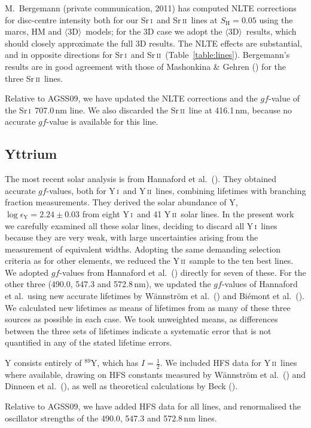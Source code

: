 \documentclass[traditabstract]{aa}
\newcommand{\oneDAV}{$\langle\mathrm{3D}\rangle$}
\newcommand{\altsri}{Sr\,\textsc{i}}
\newcommand{\altsrii}{Sr\,\textsc{ii}}
\newcommand{\altyi}{Y\,\textsc{i}}
\newcommand{\altyii}{Y\,\textsc{ii}}
\newcommand{\sri}{\altsri\ }
\newcommand{\srii}{\altsrii\ }
\newcommand{\yi}{\altyi\ }
\newcommand{\yii}{\altyii\ }
\begin{document}
M.~Bergemann (private communication, 2011) has computed NLTE corrections for disc-centre intensity both for our \sri and \srii lines at $S_\mathrm{H}=0.05$ using the {\sc marcs}, HM and \oneDAV\ models; for the 3D case we adopt the \oneDAV\ results, which should closely approximate the full 3D results.  The NLTE effects are substantial, and in opposite directions for \sri and \srii (Table~\ref{table:lines}). Bergemann's results are in good agreement with those of Mashonkina \& Gehren (\cite{mash}) for the three \srii lines.

Relative to AGSS09, we have updated the NLTE corrections and the $gf$-value of the \sri 707.0\,nm line.  We also discarded the \srii line at 416.1\,nm, because no accurate $gf$-value is available for this line.

\subsection{Yttrium}
The most recent solar analysis is from Hannaford et al.\ (\cite{hann1}). They obtained accurate $gf$-values, both for \yi and \yii lines, combining lifetimes with branching fraction measurements.  They derived the solar abundance of Y, $\log\epsilon_{\mathrm{Y}}=2.24\pm0.03$ from eight \yi and 41 \yii solar lines. In the present work we carefully examined all these solar lines, deciding to discard all \yi lines because they are very weak, with large uncertainties arising from the measurement of equivalent widths. Adopting the same demanding selection criteria as for other elements, we reduced the \yii sample to the ten best lines.  We adopted $gf$-values from Hannaford et al.\ (\cite{hann1}) directly for seven of these. For the other three (490.0, 547.3 and 572.8\,nm), we updated the $gf$-values of Hannaford et al.\ using new accurate lifetimes by W\"{a}nnstr\"{o}m et al.\ (\cite{wann}) and Bi\'{e}mont et al.\ (\cite{biem7}).  We calculated new lifetimes as means of lifetimes from as many of these three sources as possible in each case.  We took unweighted means, as differences between the three sets of lifetimes indicate a systematic error that is not quantified in any of the stated lifetime errors.

Y consists entirely of $^{89}$Y, which has $I=\frac12$.  We included HFS data for \yii lines where available, drawing on HFS constants measured by W\"{a}nnstr\"{o}m et al.\ (\cite{wann}) and Dinneen et al.\ (\cite{Dinneen}), as well as theoretical calculations by Beck (\cite{Beck}).

Relative to AGSS09, we have added HFS data for all lines, and renormalised the oscillator strengths of the 490.0, 547.3 and 572.8\,nm lines.
\end{document}
